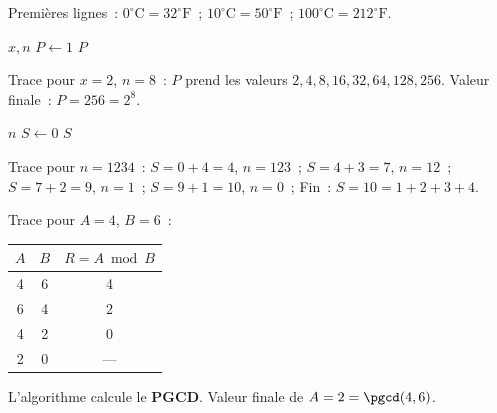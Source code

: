 \begin{algorithm}[H]
\caption{Tableau Celsius/Fahrenheit}
\end{algorithm}

Premi\`eres lignes~: $0^{\circ}\text{C}=32^{\circ}\text{F}$~;
$10^{\circ}\text{C}=50^{\circ}\text{F}$~; $100^{\circ}\text{C}=212^{\circ}\text{F}$.


\begin{algorithm}[H]
\caption{$x^n$ par multiplications}
\Lire $x, n$\;
$P \leftarrow 1$\;
\Afficher $P$\;
\end{algorithm}

Trace pour $x=2$, $n=8$~: $P$ prend les valeurs $2,4,8,16,32,64,128,256$.
Valeur finale~: $P=256=2^8$.\checkmark


\begin{algorithm}[H]
\caption{Somme des chiffres}
\Lire $n$\;
$S \leftarrow 0$\;
\Afficher $S$\;
\end{algorithm}

Trace pour $n=1234$~:
$S=0+4=4$, $n=123$~;
$S=4+3=7$, $n=12$~;
$S=7+2=9$, $n=1$~;
$S=9+1=10$, $n=0$~;
Fin~: $S=10=1+2+3+4$.\checkmark


Trace pour $A=4$, $B=6$~:
\begin{center}
\renewcommand{\arraystretch}{1.25}
\begin{tabular}{ccc}
\toprule
$A$ & $B$ & $R = A\bmod B$ \\
\midrule
4 & 6 & 4 \\
6 & 4 & 2 \\
4 & 2 & 0 \\
2 & 0 & — \\
\bottomrule
\end{tabular}
\end{center}
L'algorithme calcule le \textbf{PGCD}. Valeur finale de $A=2=\pgcd(4,6)$.

